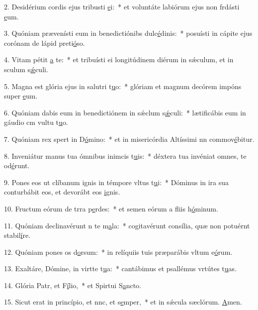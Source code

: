 2. Desidérium cordis ejus tribusti \uline{e}i:~* et voluntáte labiórum ejus non frdásti \uline{e}um.\par 
3. Quóniam prævenísti eum in benedictiónibs dulc\uline{é}dinis:~* posuísti in cápite ejus corónam de lápid preti\uline{ó}so.\par 
4. Vitam pétit \uline{a} te:~* et tribuísti ei longitúdinem diérum in sǽculum, et in sculum s\uline{ǽ}culi.\par 
5. Magna est glória ejus in salutri t\uline{u}o:~* glóriam et magnum decórem impóns super \uline{e}um.\par 
6. Quóniam dabis eum in benedictiónem in sǽclum s\uline{ǽ}culi:~* lætificábis eum in gáudio cm vultu t\uline{u}o.\par 
7. Quóniam rex spert in D\uline{ó}mino:~* et in misericórdia Altíssimi nn commov\uline{é}bitur.\par 
8. Inveniátur manus tua ómnibus inimcis t\uline{u}is:~* déxtera tua invéniat omnes,  te od\uline{é}runt.\par 
9. Pones eos ut clíbanum ignis in témpore vltus t\uline{u}i:~* Dóminus in ira sua conturbábit eos, et devorábt eos \uline{i}gnis.\par 
10. Fructum eórum de trra p\uline{e}rdes:~* et semen eórum a fliis h\uline{ó}minum.\par 
11. Quóniam declinavérunt n te m\uline{a}la:~* cogitavérunt consília, quæ non potuérnt stabil\uline{í}re.\par 
12. Quóniam pones os d\uline{o}rsum:~* in relíquiis tuis præparábis vltum e\uline{ó}rum.\par 
13. Exaltáre, Dómine, in virtte t\uline{u}a:~* cantábimus et psallémus vrtútes t\uline{u}as.\par 
14. Glória Patr, et F\uline{í}lio,~* et Spirtui S\uline{a}ncto.\par 
15. Sicut erat in princípio, et nnc, et s\uline{e}mper,~* et in sǽcula sæclórum. \uline{A}men.\par 

